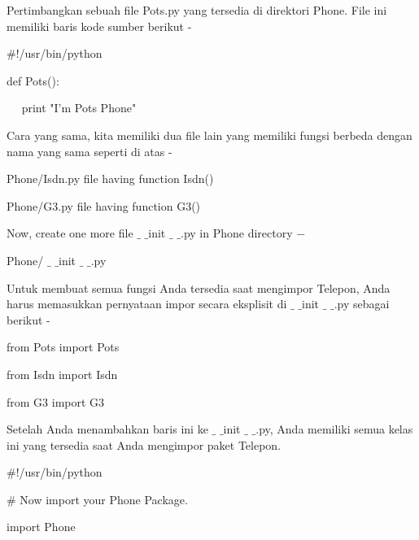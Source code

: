 \noindent 
Pertimbangkan sebuah file Pots.py yang tersedia di direktori Phone. File ini memiliki baris kode sumber berikut - \par
\noindent 
 \hspace*{0.5in}  $  \#  $!/usr/bin/python \par
\vspace{12pt}
\noindent 
 \hspace*{0.5in} def Pots(): \par
\noindent 
 \hspace*{0.5in} ~~ print "I'm Pots Phone" \par
\noindent 
Cara yang sama, kita memiliki dua file lain yang memiliki fungsi berbeda dengan nama yang sama seperti di atas - \par
\noindent 
Phone/Isdn.py $  $file having function Isdn() \par
\noindent 
Phone/G3.py $  $file having function G3() \par
\vspace{12pt}
\noindent 
Now, create one more file  $  \_  $ $  \_  $init $  \_  $ $  \_  $.py in $  $Phone $  $directory  $ - $ \par
\noindent 
Phone/ $  \_  $ $  \_  $init $  \_  $ $  \_  $.py \par
\noindent 
Untuk membuat semua fungsi Anda tersedia saat mengimpor Telepon, Anda harus memasukkan pernyataan impor secara eksplisit di  $  \_  $ $  \_  $init $  \_  $ $  \_  $.py sebagai berikut - \par
\noindent 
 \hspace*{0.5in} from Pots import Pots \par
\noindent 
 \hspace*{0.5in} from Isdn import Isdn \par
\noindent 
 \hspace*{0.5in} from G3 import G3 \par
\vspace{12pt}
\noindent 
Setelah Anda menambahkan baris ini ke  $  \_  $ $  \_  $init $  \_  $ $  \_  $.py, Anda memiliki semua kelas ini yang tersedia saat Anda mengimpor paket Telepon. \par
\noindent 
 \hspace*{0.5in}  $  \#  $!/usr/bin/python \par
\vspace{12pt}
\noindent 
 \hspace*{0.5in}  $  \#  $ Now import your Phone Package. \par
\noindent 
 \hspace*{0.5in} import Phone \par
